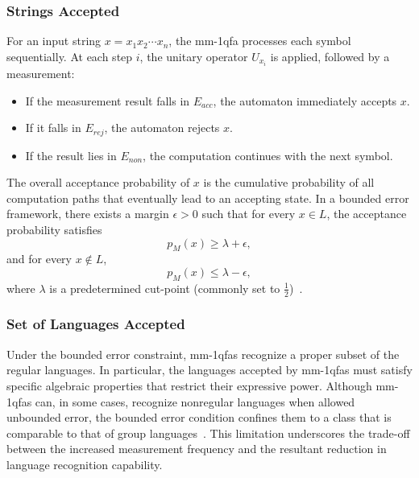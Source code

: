 \subsubsection{Strings Accepted}
For an input string $x=x_1x_2\cdots x_n$, the \gls{mm-1qfa} processes each symbol sequentially. At each step $i$, the unitary operator $U_{x_i}$ is applied, followed by a measurement:
\begin{itemize}
    \item If the measurement result falls in $E_{acc}$, the automaton immediately accepts $x$.
    \item If it falls in $E_{rej}$, the automaton rejects $x$.
    \item If the result lies in $E_{non}$, the computation continues with the next symbol.
\end{itemize}
The overall acceptance probability of $x$ is the cumulative probability of all computation paths that eventually lead to an accepting state. In a bounded error framework, there exists a margin $\epsilon > 0$ such that for every $x\in L$, the acceptance probability satisfies
\[
p_M(x) \ge \lambda + \epsilon,
\]
and for every $x\notin L$, 
\[
p_M(x) \le \lambda - \epsilon,
\]
where $\lambda$ is a predetermined cut-point (commonly set to $\frac{1}{2}$)~\cite{646094,brodsky2002characterizations}.

\subsubsection{Set of Languages Accepted}
Under the bounded error constraint, \gls{mm-1qfa}s recognize a proper subset of the regular languages. In particular, the languages accepted by \gls{mm-1qfa}s must satisfy specific algebraic properties that restrict their expressive power. Although \gls{mm-1qfa}s can, in some cases, recognize nonregular languages when allowed unbounded error, the bounded error condition confines them to a class that is comparable to that of group languages~\cite{brodsky2002characterizations,646094}. This limitation underscores the trade-off between the increased measurement frequency and the resultant reduction in language recognition capability.

